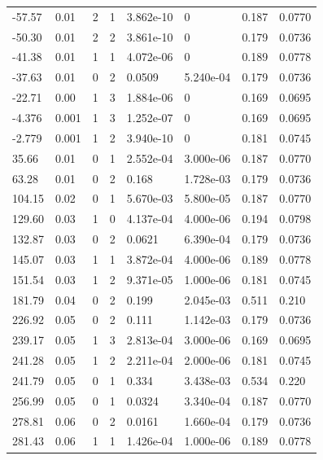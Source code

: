 \documentclass[preview]{standalone}
\begin{document}
{{\begin{tabular}{L{1.2cm}C{1.2cm} C{0.3cm}C{0.5cm} C{1.4cm}C{1.4cm} C{1.4cm}C{1.4cm}}
  -57.57  &  0.01  & 2     &  1 &  3.862e-10  & 0  & 0.187 &  0.0770   \\ 
  -50.30  &  0.01  & 2     &  2 &  3.861e-10  & 0  & 0.179 &  0.0736   \\ 
  -41.38  &  0.01  & 1     &  1 &  4.072e-06  & 0  & 0.189 &  0.0778   \\ 
  -37.63  &  0.01  & 0     &  2 &  0.0509  & 5.240e-04  & 0.179 &  0.0736   \\ 
  -22.71  &  0.00  & 1     &  3 &  1.884e-06  & 0  & 0.169 &  0.0695   \\ 
  -4.376  &  0.001  & 1     &  3 &  1.252e-07  & 0  & 0.169 &  0.0695   \\ 
  -2.779  &  0.001  & 1     &  2 &  3.940e-10  & 0  & 0.181 &  0.0745   \\ 
  35.66  &  0.01  & 0     &  1 &  2.552e-04  & 3.000e-06  & 0.187 &  0.0770   \\ 
  63.28  &  0.01  & 0     &  2 &  0.168  & 1.728e-03  & 0.179 &  0.0736   \\ 
  104.15  &  0.02  & 0     &  1 &  5.670e-03  & 5.800e-05  & 0.187 &  0.0770   \\ 
  129.60  &  0.03  & 1     &  0 &  4.137e-04  & 4.000e-06  & 0.194 &  0.0798   \\ 
  132.87  &  0.03  & 0     &  2 &  0.0621  & 6.390e-04  & 0.179 &  0.0736   \\ 
  145.07  &  0.03  & 1     &  1 &  3.872e-04  & 4.000e-06  & 0.189 &  0.0778   \\ 
  151.54  &  0.03  & 1     &  2 &  9.371e-05  & 1.000e-06  & 0.181 &  0.0745   \\ 
  181.79  &  0.04  & 0     &  2 &  0.199  & 2.045e-03  & 0.511 &  0.210   \\ 
  226.92  &  0.05  & 0     &  2 &  0.111  & 1.142e-03  & 0.179 &  0.0736   \\ 
  239.17  &  0.05  & 1     &  3 &  2.813e-04  & 3.000e-06  & 0.169 &  0.0695   \\ 
  241.28  &  0.05  & 1     &  2 &  2.211e-04  & 2.000e-06  & 0.181 &  0.0745   \\ 
  241.79  &  0.05  & 0     &  1 &  0.334  & 3.438e-03  & 0.534 &  0.220   \\ 
  256.99  &  0.05  & 0     &  1 &  0.0324  & 3.340e-04  & 0.187 &  0.0770   \\ 
  278.81  &  0.06  & 0     &  2 &  0.0161  & 1.660e-04  & 0.179 &  0.0736   \\ 
  281.43  &  0.06  & 1     &  1 &  1.426e-04  & 1.000e-06  & 0.189 &  0.0778   \\ 

\end{tabular}}}
\end{document}
